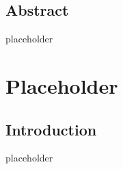 \documentclass{article}
\begin{document}
\tableofcontents

\vspace{30pt}

\subsection*{Abstract}

placeholder

\newpage

\setcounter{page}{1}
\fancyfoot[R]{\thepage}

\section{Placeholder}

\subsection*{Introduction}

placeholder\cite{cudasharedmemory}

\newpage
\nocite{*}


\end{document}
